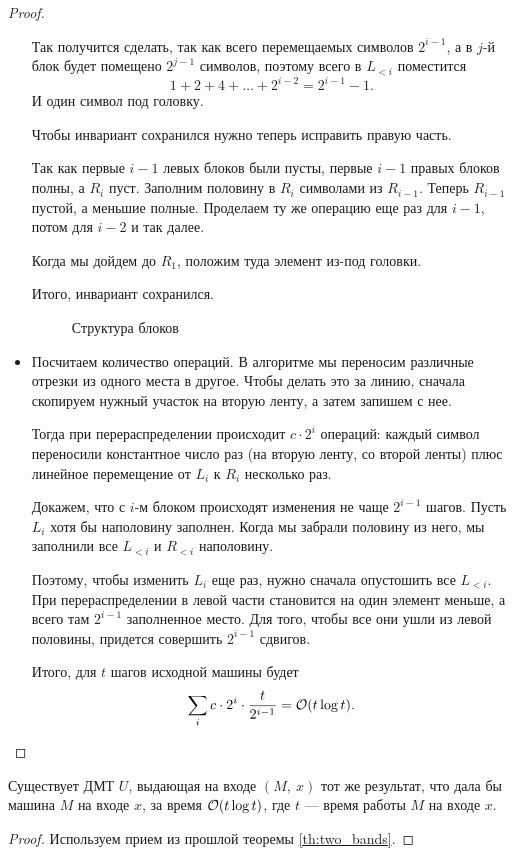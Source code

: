 \begin{proof}
\begin{itemize}
			Так получится сделать, так как всего перемещаемых символов $ 2^{i-1}$, а в $ j$-й блок будет помещено $ 2^{j-1}$ символов, поэтому всего в $ L_{<i}$ поместится
			\[
				1 + 2 + 4 + \ldots + 2^{i-2} = 2^{i-1} - 1
			.\]
			И один символ под головку.

			Чтобы инвариант сохранился нужно теперь исправить правую часть.

			Так как первые $ i-1$ левых блоков были пусты, первые $ i-1$ правых блоков полны, а $ R_i$ пуст.
			Заполним половину в $ R_i$ символами из $ R_{i-1}$.
			Теперь $ R_{i-1}$ пустой, а меньшие полные. Проделаем ту же операцию еще раз для $ i-1$, потом для $ i-2$ и так далее.

			Когда мы дойдем до $ R_1$, положим туда элемент из-под головки.

			Итого, инвариант  сохранился.
			\begin{figure}[ht]
				\centering
				\caption{Структура блоков}
				\label{fig:blocks}
			\end{figure}
		\item Посчитаем количество операций. В алгоритме мы переносим различные отрезки из одного места в другое. Чтобы делать это за линию, сначала скопируем нужный участок на вторую ленту, а затем запишем с нее.

			Тогда при перераспределении происходит $ c\cdot 2^{i}$ операций: каждый символ переносили константное число раз (на вторую ленту, со второй ленты)  плюс линейное перемещение от $ L_i$ к $ R_i$ несколько раз.

			Докажем, что с $ i$-м блоком происходят изменения не чаще $ 2^{i-1}$  шагов. Пусть $ L_i$ хотя бы наполовину заполнен. Когда мы забрали половину из него, мы заполнили все $ L_{<i}$ и $ R_{<i}$ наполовину.

			Поэтому, чтобы изменить $ L_i$ еще раз, нужно сначала опустошить все $ L_{<i}$.
			При перераспределении в левой части становится на один элемент меньше, а всего там $ 2^{i-1}$ заполненное место. Для того, чтобы все они ушли из левой половины, придется совершить $ 2^{i-1}$ сдвигов.

			Итого, для $ t$ шагов исходной машины будет
			\[
				\sum_{i}^{}c\cdot 2^{i} \cdot \frac{t}{2^{i-1}} = \mathcal{O}(t \log t)
			.\]
	\end{itemize}
\end{proof}

\begin{thm}[Об универсальной МТ]
	Существует ДМТ $ U$, выдающая на входе $(M, ~ x)$ тот же результат, что дала бы машина $ M$ на входе $ x$, за время $ \mathcal{O}(t \log t)$, где $ t $ --- время работы $ M$ на входе $ x$.
\end{thm}
\begin{proof}
	Используем прием из прошлой теоремы \ref{th:two_bands}.
\end{proof}

